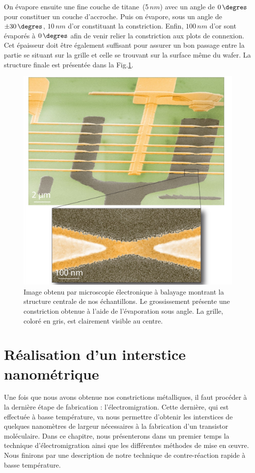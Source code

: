 On évapore ensuite une fine couche de titane~(5$\, nm$) avec un angle de $0\,\degres$ pour constituer un couche d'accroche. Puis on évapore, sous un angle de $\pm30\,\degres$, $10\, nm$ d'or  constituant la constriction. Enfin, $100\,nm$ d'or sont évaporés à $0\,\degres$ afin de venir relier la constriction aux plots de connexion. Cet épaisseur doit être également suffisant pour assurer un bon passage entre la partie se situant sur la grille et celle se trouvant sur la surface même du wafer. La structure finale est présentée dans la Fig.\ref{ZoomFinal}.

\begin{figure}
\centering \includegraphics[scale=0.45]{Fabrication/ZoomFinal/ZoomFinal.pdf}
\caption{Image obtenu par microscopie électronique à balayage montrant la structure centrale de nos échantillons. Le grossissement présente une constriction obtenue à l'aide de l'évaporation sous angle. La grille, coloré en gris, est clairement visible au centre.}
\label{ZoomFinal}
\end{figure}


\section{Réalisation d'un interstice nanométrique}
Une fois que nous avons obtenue nos constrictions métalliques, il faut procéder à la dernière étape de fabrication : l'électromigration. Cette dernière, qui est effectuée à basse température, va nous permettre d'obtenir les interstices de quelques nanomètres de largeur nécessaires à la fabrication d'un transistor moléculaire. Dans ce chapitre, nous présenterons dans un premier temps la technique d'électromigration ainsi que les différentes méthodes de mise en œuvre. Nous finirons par une description de notre technique de contre-réaction rapide à basse température.

